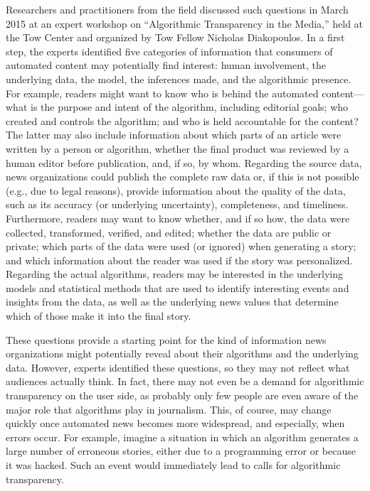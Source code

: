 \documentclass[notoc, symmetric, nobib, nols]{towcenter-guideto-book}
\begin{document}
Researchers and practitioners from the field discussed such questions in March 2015 at an expert workshop on ``Algorithmic Transparency in the Media,'' held at the Tow Center and organized by Tow Fellow Nicholas Diakopoulos. In a first step, the experts identified five categories of information that consumers of automated content may potentially find interest: human involvement, the underlying data, the model, the inferences made, and the algorithmic presence.\autocite{diak15} For example, readers might want to know who is behind the automated content---what is the purpose and intent of the algorithm, including editorial goals; who created and controls the algorithm; and who is held accountable for the content? The latter may also include information about which parts of an article were written by a person or algorithm, whether the final product was reviewed by a human editor before publication, and, if so, by whom. Regarding the source data, news organizations could publish the complete raw data or, if this is not possible (e.g., due to legal reasons), provide information about the quality of the data, such as its accuracy (or underlying uncertainty), completeness, and timeliness. Furthermore, readers may want to know whether, and if so how, the data were collected, transformed, verified, and edited; whether the data are public or private; which parts of the data were used (or ignored) when generating a story; and which information about the reader was used if the story was personalized. Regarding the actual algorithms, readers may be interested in the underlying models and statistical methods that are used to identify interesting events and insights from the data, as well as the underlying news values that determine which of those make it into the final story. 

These questions provide a starting point for the kind of information news organizations might potentially reveal about their algorithms and the underlying data. However, experts identified these questions, so they may not reflect what audiences actually think. In fact, there may not even be a demand for algorithmic transparency on the user side, as probably only few people are even aware of the major role that algorithms play in journalism. This, of course, may change quickly once automated news becomes more widespread, and especially, when errors occur. For example, imagine a situation in which an algorithm generates a large number of erroneous stories, either due to a programming error or because it was hacked. Such an event would immediately lead to calls for algorithmic transparency. 
\end{document}
